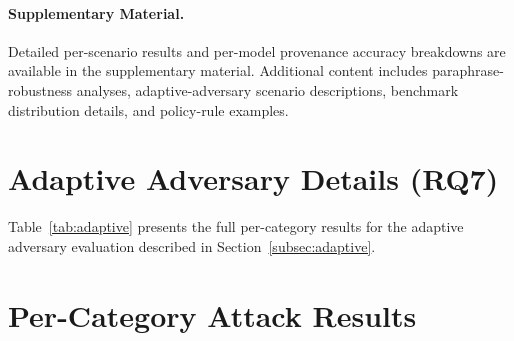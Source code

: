 \paragraph{Supplementary Material.} Detailed per-scenario results and per-model provenance accuracy breakdowns are available in the supplementary material. Additional content includes paraphrase-robustness analyses, adaptive-adversary scenario descriptions, benchmark distribution details, and policy-rule examples.

\section{Adaptive Adversary Details (RQ7)}
\label{sec:appendix-adaptive}

Table~\ref{tab:adaptive} presents the full per-category results for the adaptive adversary evaluation described in Section~\ref{subsec:adaptive}.

\begin{table}[htbp]
\centering
\caption{Adaptive adversary evaluation (60 scenarios: 50 attacks + 10 benign controls, 180 LLM trials with Llama-3.1-8B, 3 reps). Five white-box attack strategies.}
\label{tab:adaptive}
\scriptsize
{}
\end{table}

\section{Per-Category Attack Results}
\label{sec:appendix-categories}


